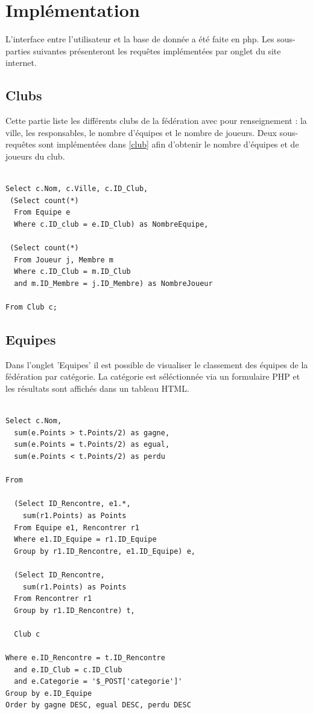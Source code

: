 \documentclass[a4paper»,8pt,french,fleqn]{report}
\begin{document}
\chapter{Implémentation}

L'interface entre l'utilisateur et la base de donnée a été faite en php. Les sous-parties suivantes présenteront les requêtes implémentées par onglet du site internet.

\section{Clubs}

Cette partie liste les différents clubs de la fédération avec pour renseignement : la ville, les responsables, le nombre d'équipes et le nombre de joueurs. Deux sous-requêtes sont implémentées dans \ref{club} afin d'obtenir le nombre d'équipes et de joueurs du club. 

\begin{lstlisting}

Select c.Nom, c.Ville, c.ID_Club,
 (Select count(*) 
  From Equipe e
  Where c.ID_club = e.ID_Club) as NombreEquipe,

 (Select count(*) 
  From Joueur j, Membre m
  Where c.ID_Club = m.ID_Club
  and m.ID_Membre = j.ID_Membre) as NombreJoueur

From Club c;
\end{lstlisting}

\section{Equipes}

Dans l'onglet 'Equipes' il est possible de visualiser le classement des équipes de la fédération par catégorie. La catégorie est séléctionnée via un formulaire PHP et les résultats sont affichés dans un tableau HTML.

\begin{lstlisting}

Select c.Nom,
  sum(e.Points > t.Points/2) as gagne,
  sum(e.Points = t.Points/2) as egual,
  sum(e.Points < t.Points/2) as perdu
  
From
  
  (Select ID_Rencontre, e1.*,
    sum(r1.Points) as Points
  From Equipe e1, Rencontrer r1
  Where e1.ID_Equipe = r1.ID_Equipe
  Group by r1.ID_Rencontre, e1.ID_Equipe) e,

  (Select ID_Rencontre,
    sum(r1.Points) as Points
  From Rencontrer r1
  Group by r1.ID_Rencontre) t,
  
  Club c

Where e.ID_Rencontre = t.ID_Rencontre
  and e.ID_Club = c.ID_Club
  and e.Categorie = '$_POST['categorie']'
Group by e.ID_Equipe
Order by gagne DESC, egual DESC, perdu DESC

\end{lstlisting}
\end{document}
